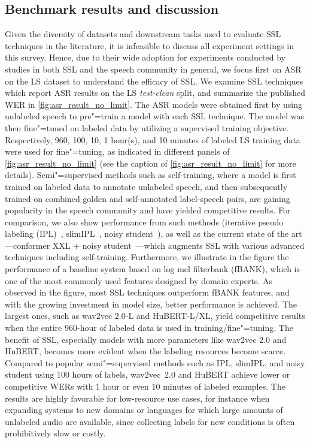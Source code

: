\subsection{Benchmark results and discussion} \label{sec:benchmark} 
Given the diversity of datasets and downstream tasks used to evaluate SSL
techniques in the literature, it is infeasible to discuss all 
experiment settings in this survey. Hence, due to their wide adoption for
experiments conducted by studies in both SSL and the speech community in
general, we focus first on ASR on the LS dataset to understand the
efficacy of SSL. We examine SSL techniques which report ASR results on the LS
\textit{test-clean} split, and summarize the published WER in
\cref{fig:asr_result_no_limit}. The ASR models were obtained first by using
unlabeled speech to pre"=train a model with each SSL technique. The model was
then fine"=tuned on labeled data by utilizing a supervised training objective.
Respectively, 960, 100, 10, 1 hour(s), and 10 minutes of labeled LS training data
were used for fine"=tuning, as indicated in different panels of
\cref{fig:asr_result_no_limit} (see
the caption of \cref{fig:asr_result_no_limit} for more details).
Semi"=supervised methods such as self-training, where a model is first trained
on labeled data to annotate unlabeled speech, and then subsequently trained on
combined golden and self-annotated label-speech pairs, are gaining popularity
in the speech community and have yielded competitive results. For comparison, we also
show performance from such methods (iterative pseudo labeling 
(IPL)~\parencite{xu_iterative_2020}, slimIPL~\parencite{likhomanenko_slimipl_2021}, noisy 
student~\parencite{park_improved_2020}), as well as the current state of the art---conformer XXL + noisy
student~\parencite{zhang_pushing_2020}---which augments SSL with various advanced
techniques including self-training. Furthermore, we illustrate in the figure
the performance of a baseline system \parencite{yang_superb_2021} based on log mel filterbank (fBANK), which is one of the most commonly used features designed by domain experts.
As observed in the figure, most SSL techniques outperform fBANK
features, and with the growing investment in model size, better performance is
achieved. The largest ones, such as wav2vec 2.0-L and HuBERT-L/XL, yield competitive results 
when the entire 960-hour of labeled data is used in
training/fine"=tuning. The benefit of SSL, especially models with more parameters
like wav2vec 2.0 and HuBERT, becomes more evident when the labeling resources
become scarce. Compared to popular semi"=supervised methods such as IPL,
slimIPL, and noisy student using 100 hours of labels, wav2vec~2.0 and HuBERT
achieve lower or competitive WERs with 1 hour or even 10 minutes of labeled
examples. The results are highly favorable for low-resource use cases, for instance when
expanding systems to new domains or languages for which large amounts of unlabeled
audio are available, since collecting labels for new conditions is often prohibitively
slow or costly.

